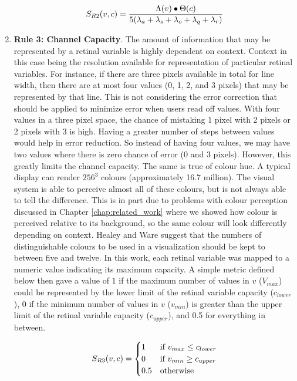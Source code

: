 \begin{enumerate}
\[
\vspace{-1mm}
	S_{R2}(v, c) = \frac{\Lambda(v) \bullet \Theta(c)}
	{5 (\lambda_a + \lambda_s + \lambda_o + \lambda_q + \lambda_r)}
\]

\item \textbf{Rule 3: Channel Capacity}. The amount of information that may be represented by a retinal variable is highly dependent on context. 
Context in this case being the resolution available for representation of particular retinal variables.
For instance, if there are three pixels available in total for line width, then there are at most four values (0, 1, 2, and 3 pixels) that may be represented by that line.
This is not considering the error correction that should be applied to minimize error when users read off values.
With four values in a three pixel space, the chance of mistaking 1 pixel with 2 pixels or 2 pixels with 3 is high.
Having a greater number of steps between values would help in error reduction. 
So instead of having four values, we may have two values where there is zero chance of error (0 and 3 pixels). 
However, this greatly limits the channel capacity.
The same is true of colour hue. 
A typical display can render $256^3$ colours (approximately 16.7 million).
The visual system is able to perceive almost all of these colours, but is not always able to tell the difference. 
This is in part due to problems with colour perception discussed in Chapter \ref{chap:related_work} where we showed how colour is perceived relative to its background, so the same colour will look differently depending on context.
Healey \cite{healey1996choosing} and Ware \cite{ware13} suggest that the numbers of distinguishable colours to be used in a visualization should be kept to between five and twelve. 
In this work, each retinal variable was mapped to a numeric value indicating its maximum capacity. 
A simple metric defined below then gave a value of $1$ if the maximum number of values in $v$ ($V_{max}$) could be represented by the lower limit of the retinal variable capacity ($c_{lower}$), $0$ if the minimum number of values in $v$ ($v_{min}$) is greater than the upper limit of the retinal variable capacity ($c_{upper}$), and 0.5 for everything in between.

\[
\vspace{-2mm}
	S_{R3}(v, c) = \begin{cases}
	1 & \text{if }v_{max} \leq c_{lower}\\
	0 & \text{if }v_{min} \geq c_{upper}\\
	0.5 & \text{otherwise}
	\end{cases}
\vspace{-1mm}
\]



\end{enumerate}

